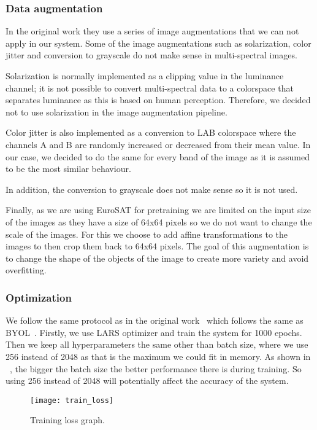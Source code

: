 \documentclass[conference]{IEEEtran}
\begin{document}
    \subsubsection{Data augmentation}
    In the original work they use a series of image augmentations that we can not apply in our system.
    Some of the image augmentations such as solarization, color jitter and conversion to grayscale do not make sense in multi-spectral images.

    Solarization is normally implemented as a clipping value in the luminance channel; it is not possible to convert multi-spectral data to
    a colorspace that separates luminance as this is based on human perception.
    Therefore, we decided not to use solarization in the image augmentation pipeline.

    Color jitter is also implemented as a conversion to LAB colorspace where the channels A and B are randomly increased or decreased from their mean value.
    In our case, we decided to do the same for every band of the image as it is assumed to be the most similar behaviour.

    In addition, the conversion to grayscale does not make sense so it is not used.

    Finally, as we are using EuroSAT for pretraining we are limited on the input size of the images as they have a size of 64x64 pixels so we do not want to change the scale of the images.
    For this we choose to add affine transformations to the images to then crop them back to 64x64 pixels.
    The goal of this augmentation is to change the shape of the objects of the image to create more variety and avoid overfitting.

    \subsubsection{Optimization}
    We follow the same protocol as in the original work~\cite{barlowtwins} which follows the same as BYOL~\cite{grill2020bootstrap}.
    Firstly, we use LARS optimizer and train the system for 1000 epochs.
    Then we keep all hyperparameters the same other than batch size, where we use 256 instead of 2048 as that is the maximum we could fit in memory.
    As shown in ~\citet{grill2020bootstrap, chen2020simple, barlowtwins}, the bigger the batch size the better performance there is during training.
    So using 256 instead of 2048 will potentially affect the accuracy of the system.

    \begin{figure}[h]
        \centering
        \texttt{[image: train\_loss]}
        \caption{Training loss graph.}
        \label{fig:training_loss_graph}
    \end{figure}
\end{document}
